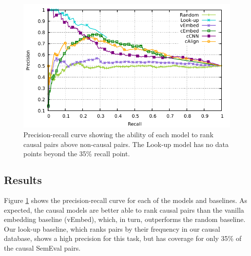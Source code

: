 \begin{figure}[t]
\begin{center}
\includegraphics[width=\textwidth]{mainmatter/emnlp2016-causal/direct_noBi2.pdf} %
\caption{{Precision-recall curve showing the ability of each model to rank causal pairs above non-causal pairs. 
The Look-up model has no data points beyond the 35\% recall point.}}
\label{fig:rpcurve_all}
\end{center}
\end{figure}

\subsection{Results}
\label{sec-emnlp2016:results}

Figure \ref{fig:rpcurve_all} shows the precision-recall curve for each of the models and baselines. 
As expected, the causal models are better able to rank causal pairs than the vanilla embedding baseline (vEmbed), which, in turn, outperforms the random baseline.  Our look-up baseline, which ranks pairs by their frequency in our causal database, shows a high precision for this task, but has coverage for only 35\% of the causal SemEval pairs.
%

